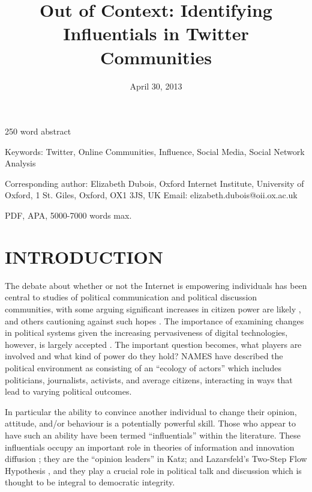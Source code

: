 \documentclass[a4paper,12pt]{article}
\title{Out of Context: Identifying Influentials in Twitter Communities}
\date{April 30, 2013}
\author{}
\begin{document}
\maketitle

\onehalfspacing
\newcommand{\specialcell}[2][c]{%
  \begin{tabular}[#1]{@{}c@{}}#2\end{tabular}}

250 word abstract

Keywords:
Twitter, Online Communities, Influence, Social Media, Social Network Analysis

Corresponding author:
Elizabeth Dubois, Oxford Internet Institute, University of Oxford, 1 St. Giles, Oxford, OX1 3JS, 
UK 
Email: elizabeth.dubois@oii.ox.ac.uk

PDF, APA, 5000-7000 words max.

\section{INTRODUCTION}


The debate about whether or not the Internet is empowering individuals has been central to studies of political communication and political discussion communities, with some arguing significant increases in citizen power are likely \cite{Blumler2001, dahlgren00, dahlgren05}, and others cautioning against such hopes \cite{hindman}. The importance of examining changes in political systems given the increasing pervasiveness of digital technologies, however, is largely accepted \cite{agre}. The important question becomes, what players are involved and what kind of power do they hold? NAMES have described the political environment as consisting of an ``ecology of actors'' which includes politicians, journalists, activists, and average citizens, interacting in ways that lead to varying political outcomes. 

In particular the ability to convince another individual to change their opinion, attitude, and/or behaviour is a potentially powerful skill. Those who appear to have such an ability have been termed ``influentials'' within the literature.  These influentials occupy an important role in theories of information and innovation diffusion \cite{rogers4th}; they are the ``opinion leaders'' in Katz; and Lazarsfeld's Two-Step Flow Hypothesis \citeyear{katzlazarsfeld}, and they play a crucial role in political talk and discussion which is thought to be integral to democratic integrity. 
\end{document}
